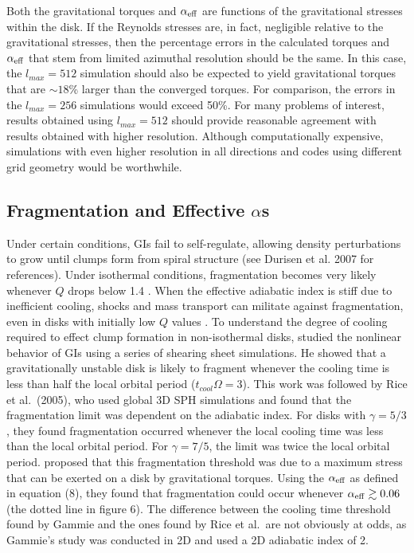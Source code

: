 \documentclass[manuscript]{aastex}
\begin{document}
Both the gravitational torques and $\alpha_{\rm{eff}}$ are functions of the
gravitational stresses within the disk.  If the Reynolds stresses are, in fact, negligible relative to the gravitational stresses,
then the percentage errors in the calculated torques and $\alpha_{\rm{eff}}$ that stem from limited azimuthal resolution 
should be the same. In this case, the  $l_{max} = 512$ simulation should also be expected to yield
gravitational torques that are $\sim 18$\% larger than the converged torques.  For comparison, the
errors in the $l_{max} = 256$ simulations would exceed 50\%. For many problems of interest,
results obtained using $l_{max} = 512$ should provide reasonable agreement with results obtained 
with higher resolution. 
Although computationally expensive, simulations with even higher resolution in all directions and codes using different grid geometry
would be worthwhile.

\subsection{Fragmentation and Effective $\alpha$s}

\noindent

Under certain conditions, GIs fail to self-regulate, allowing density perturbations to grow until clumps form from spiral structure (see Durisen et al. 2007 for references).  Under isothermal conditions, fragmentation becomes very likely whenever $Q$ drops below 1.4 
\citep{tomley1991, tomley1994, nelson1998, mayer2002}. When the effective adiabatic index is stiff due to inefficient
cooling, shocks and mass transport can militate against fragmentation, even in disks with initially low $Q$ values
\citep[e.g., ][]{boley2008}. To understand the degree of cooling required to effect clump formation in non-isothermal
disks, \cite{gammie2001} studied the nonlinear behavior of GIs using a series of shearing sheet simulations.  He showed
that  a gravitationally unstable disk is likely to fragment whenever the cooling time is less than half the local
orbital period ($t_{cool}\Omega = 3$).  This work was followed by Rice et al.~(2005), who used global 3D SPH simulations and found that the fragmentation limit was dependent on the adiabatic index.   For disks with $\gamma=5/3$, they found fragmentation 
occurred whenever the local cooling time was less than the local orbital period. For $\gamma=7/5$, the limit was twice the local orbital period.  \cite{rice2005} proposed that this fragmentation threshold was due to a maximum stress that can  be exerted on a disk by gravitational torques.  Using the $\alpha_{\rm{eff}}$ as defined in equation (8), they found that fragmentation could occur whenever $\alpha_{\rm eff}\gtrsim 0.06$ (the dotted line in figure 6).  The difference between the cooling time threshold found by Gammie and the ones found by Rice et al.~are not obviously at odds, as Gammie's study was conducted in 2D and used a 2D adiabatic index of 2.  
\end{document}
